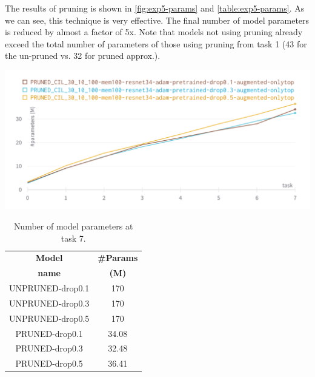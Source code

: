 The results of pruning is shown in \autoref{fig:exp5-params} and \autoref{table:exp5-params}.
As we can see, this technique is very effective.
The final number of model parameters is reduced by almost a factor of 5x.
Note that models not using pruning already exceed the total number of parameters of those using pruning from task 1 (43 for the un-pruned vs. 32 for pruned approx.).

\begin{table}[ht]
    \begin{minipage}[b]{0.49\linewidth}
        \centering
        \includegraphics[width=1\linewidth]{images/exp/exp5-params.png}
        \label{fig:exp5-params}
    \end{minipage}
    \hfill
    \begin{minipage}[b]{0.49\linewidth}
        \centering
        \begin{tabular}{c|c}
            \hline
            \textbf{Model} &
            \textbf{\#Params} \\
            \textbf{name} &
            \textbf{(M)} \\
            \hline
            \hline
UNPRUNED-drop0.1&170\\
UNPRUNED-drop0.3&170\\
UNPRUNED-drop0.5&170\\
\hline
PRUNED-drop0.1&34.08\\
PRUNED-drop0.3&32.48\\
PRUNED-drop0.5&36.41\\
            \hline
        \end{tabular}
            \caption{Number of model parameters at task 7.}
            \label{fig:exp5-params}
    \end{minipage}
\end{table}

